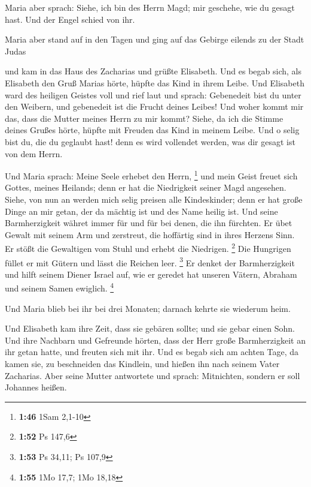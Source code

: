  Maria aber sprach: Siehe, ich bin des Herrn Magd; mir
geschehe, wie du gesagt hast. Und der Engel schied von ihr.

 Maria aber stand auf in den Tagen und ging auf das
Gebirge eilends zu der Stadt Judas

 und kam in das Haus des Zacharias und grüßte Elisabeth.
 Und es begab sich, als Elisabeth den Gruß Marias hörte,
hüpfte das Kind in ihrem Leibe. Und Elisabeth ward des heiligen Geistes
voll  und rief laut und sprach: Gebenedeit bist du unter
den Weibern, und gebenedeit ist die Frucht deines Leibes!
 Und woher kommt mir das, dass die Mutter meines Herrn zu
mir kommt?  Siehe, da ich die Stimme deines Grußes hörte,
hüpfte mit Freuden das Kind in meinem Leibe.  Und o selig
bist du, die du geglaubt hast! denn es wird vollendet werden, was dir
gesagt ist von dem Herrn.

 Und Maria sprach: Meine Seele erhebet den Herrn,
\footnote{\textbf{1:46} 1Sam 2,1-10}  und mein Geist
freuet sich Gottes, meines Heilands;  denn er hat die
Niedrigkeit seiner Magd angesehen. Siehe, von nun an werden mich selig
preisen alle Kindeskinder;  denn er hat große Dinge an
mir getan, der da mächtig ist und des Name heilig ist. 
Und seine Barmherzigkeit währet immer für und für bei denen, die ihn
fürchten.  Er übet Gewalt mit seinem Arm und zerstreut,
die hoffärtig sind in ihres Herzens Sinn.  Er stößt die
Gewaltigen vom Stuhl und erhebt die Niedrigen. \footnote{\textbf{1:52}
  Ps 147,6}  Die Hungrigen füllet er mit Gütern und lässt
die Reichen leer. \footnote{\textbf{1:53} Ps 34,11; Ps 107,9}
 Er denket der Barmherzigkeit und hilft seinem Diener
Israel auf,  wie er geredet hat unseren Vätern, Abraham
und seinem Samen ewiglich. \footnote{\textbf{1:55} 1Mo 17,7; 1Mo 18,18}

 Und Maria blieb bei ihr bei drei Monaten; darnach kehrte
sie wiederum heim.

 Und Elisabeth kam ihre Zeit, dass sie gebären sollte;
und sie gebar einen Sohn.  Und ihre Nachbarn und
Gefreunde hörten, dass der Herr große Barmherzigkeit an ihr getan hatte,
und freuten sich mit ihr.  Und es begab sich am achten
Tage, da kamen sie, zu beschneiden das Kindlein, und hießen ihn nach
seinem Vater Zacharias.  Aber seine Mutter antwortete und
sprach: Mitnichten, sondern er soll Johannes heißen.

